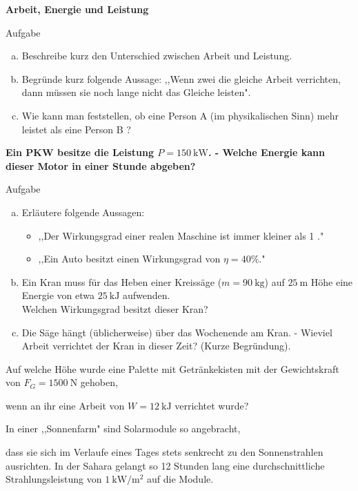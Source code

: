 \documentclass[a4paper]{article}
\begin{document}
{\bf Arbeit, Energie und Leistung }\\
\begin{enumerate}[1.]
{\bf \item Aufgabe}
\begin{enumerate}[a)]
\item Beschreibe kurz den Unterschied zwischen Arbeit und Leistung.
\item Begründe kurz folgende Aussage: ,,Wenn zwei die gleiche Arbeit verrichten, dann müssen sie noch lange nicht das Gleiche leisten".
\item Wie kann man feststellen, ob eine Person A (im physikalischen Sinn)
 mehr leistet als eine Person B ?
\end{enumerate}

{\item \bf Ein PKW besitze die Leistung $P=\SI{150}{\kilo\watt}$. - Welche Energie kann dieser Motor in einer Stunde abgeben?}

{\bf \item Aufgabe }
\begin{enumerate}[a)]
\item Erläutere folgende Aussagen:
\begin{itemize}
\item ,,Der Wirkungsgrad einer realen Maschine ist immer kleiner als 1 ."
\item ,,Ein Auto besitzt einen Wirkungsgrad von $\eta = 40 \%$."
\end{itemize}
\item Ein Kran muss für das Heben einer Kreissäge ($m=\SI{90}{\kilogram}$) auf $\SI{25}{\meter}$ Höhe eine Energie von etwa $\SI{25}{\kilo\joule}$ aufwenden. \\
Welchen Wirkungsgrad besitzt dieser Kran?
\item Die Säge hängt (üblicherweise) über das Wochenende am Kran. - Wieviel Arbeit verrichtet der Kran in dieser Zeit? (Kurze Begründung).  
\end{enumerate}



{\bf \item Auf welche Höhe wurde eine Palette mit Getränkekisten mit der Gewichtskraft von $F_G=\SI{1500}{\newton}$
gehoben,} wenn an ihr eine Arbeit von $W=\SI{12}{\kilo\joule}$ verrichtet wurde?

{\bf \item In einer ,,Sonnenfarm" sind Solarmodule so angebracht,} dass sie sich im Verlaufe eines Tages stets senkrecht zu den Sonnenstrahlen ausrichten. In der Sahara gelangt so 12 Stunden lang eine durchschnittliche Strahlungsleistung von $ \SI{1}{\kilo\watt\per\meter^2} $ auf die Module.


\end{enumerate}
\end{document}
